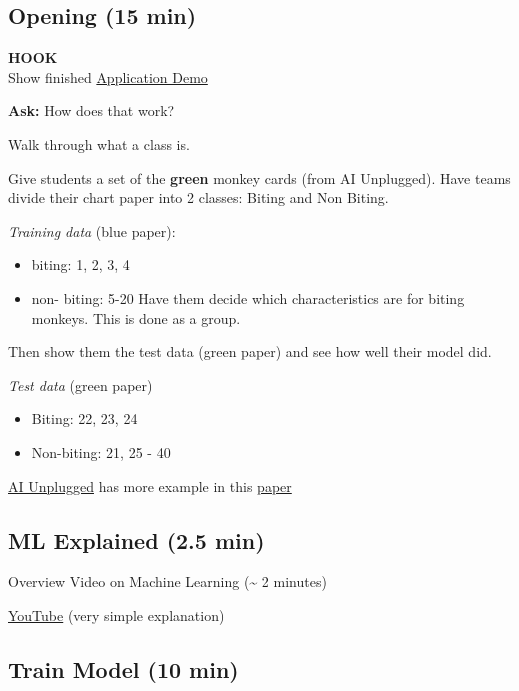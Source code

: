 \documentclass[
]{report}
\providecommand{\tightlist}{%
  \setlength{\itemsep}{0pt}\setlength{\parskip}{0pt}}\usepackage{longtable,booktabs,array}
\begin{document}
\hypertarget{opening-15-min}{%
\subsection{Opening (15 min)}\label{opening-15-min}}

\textbf{HOOK}\\
Show finished
\href{https://ejboettcher.github.io/gemcityML-No-CodeAI/application_demo/index.html}{Application
Demo}

\textbf{Ask:} How does that work?

Walk through what a class is.

Give students a set of the \textbf{green} monkey cards (from AI
Unplugged). Have teams divide their chart paper into 2 classes: Biting
and Non Biting.

\emph{Training data} (blue paper):

\begin{itemize}
\tightlist
\item
  biting: 1, 2, 3, 4
\item
  non- biting: 5-20 Have them decide which characteristics are for
  biting monkeys. This is done as a group.
\end{itemize}

Then show them the test data (green paper) and see how well their model
did.

\emph{Test data} (green paper)

\begin{itemize}
\tightlist
\item
  Biting: 22, 23, 24
\item
  Non-biting: 21, 25 - 40
\end{itemize}

\href{https://www.aiunplugged.org/monkey_game.pdf}{AI Unplugged} has
more example in this \href{./data/monkey_paper.pdf}{paper}

\hypertarget{ml-explained-2.5-min}{%
\subsection{ML Explained (2.5 min)}\label{ml-explained-2.5-min}}

Overview Video on Machine Learning (\textasciitilde{} 2 minutes)

\href{https://www.youtube.com/watch?v=f_uwKZIAeM0}{YouTube} (very simple
explanation)

\hypertarget{train-model-10-min}{%
\subsection{Train Model (10 min)}\label{train-model-10-min}}
\end{document}

